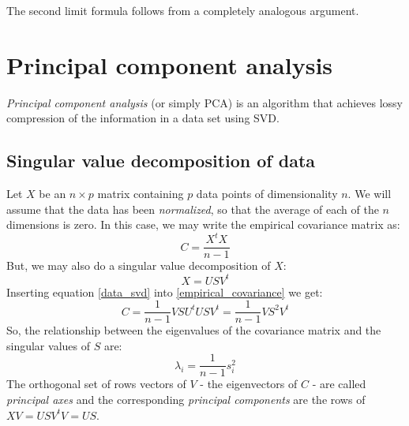 \documentclass[12pt, a4paper]{article}
\numberwithin{equation}{section}
\begin{document}
The second limit formula follows from a completely analogous argument.

\section{Principal component analysis}
\textit{Principal component analysis} (or simply PCA) is an algorithm that achieves lossy compression of the information in a data set using SVD.

\subsection{Singular value decomposition of data}
Let $X$ be an $n\times p$ matrix containing $p$ data points of dimensionality $n$. We will assume that the data has been \textit{normalized}, so that the average of each of the $n$ dimensions is zero. In this case, we may write the empirical covariance matrix as:
\begin{equation}
\label{empirical_covariance}
C=\frac{X^t X}{n-1}
\end{equation} 
But, we may also do a singular value decomposition of $X$:
\begin{equation}
\label{data_svd}
X=USV^t
\end{equation}
Inserting equation \ref{data_svd} into \ref{empirical_covariance} we get:
\begin{equation}
C=\frac{1}{n-1}VSU^t USV^t=\frac{1}{n-1}VS^2 V^t
\end{equation}
So, the relationship between the eigenvalues of the covariance matrix and the singular values of $S$ are:
\begin{equation}
\lambda_i=\frac{1}{n-1}s_i^2
\end{equation}
The orthogonal set of rows vectors of $V$ - the eigenvectors of $C$ - are called \textit{principal axes} and the corresponding \textit{principal components} are the rows of $XV=USV^t V=US$.
\end{document}
